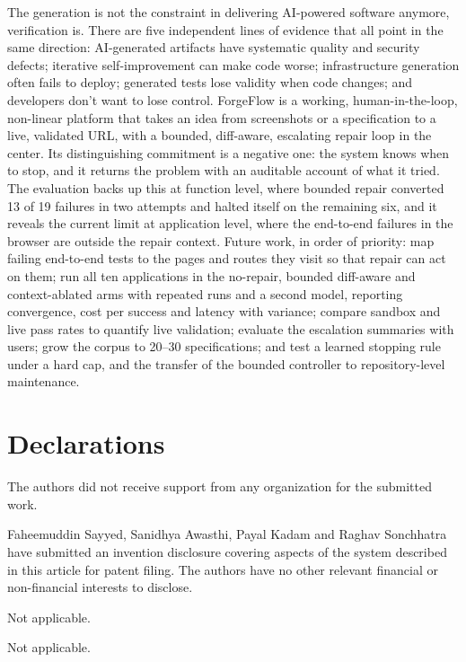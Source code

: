 \documentclass[pdflatex,sn-mathphys-num]{sn-jnl}%
\theoremstyle{thmstyleone}%
\theoremstyle{thmstyletwo}%
\theoremstyle{thmstylethree}%
\begin{document}
The generation is not the constraint in delivering AI-powered software anymore, verification is. There are five independent lines of evidence that all point in the same direction: AI-generated artifacts have systematic quality and security defects; iterative self-improvement can make code worse; infrastructure generation often fails to deploy; generated tests lose validity when code changes; and developers don't want to lose control. ForgeFlow is a working, human-in-the-loop, non-linear platform that takes an idea from screenshots or a specification to a live, validated URL, with a bounded, diff-aware, escalating repair loop in the center. Its distinguishing commitment is a negative one: the system knows when to stop, and it returns the problem with an auditable account of what it tried. The evaluation backs up this at function level, where bounded repair converted 13 of 19 failures in two attempts and halted itself on the remaining six, and it reveals the current limit at application level, where the end-to-end failures in the browser are outside the repair context. Future work, in order of priority: map failing end-to-end tests to the pages and routes they visit so that repair can act on them; run all ten applications in the no-repair, bounded diff-aware and context-ablated arms with repeated runs and a second model, reporting convergence, cost per success and latency with variance; compare sandbox and live pass rates to quantify live validation; evaluate the escalation summaries with users; grow the corpus to 20--30 specifications; and test a learned stopping rule under a hard cap, and the transfer of the bounded controller to repository-level maintenance.

\backmatter

\section*{Declarations}

The authors did not receive support from any organization for the submitted work.

Faheemuddin Sayyed, Sanidhya Awasthi, Payal Kadam and Raghav Sonchhatra have submitted an invention disclosure covering aspects of the system described in this article for patent filing. The authors have no other relevant financial or non-financial interests to disclose.

Not applicable.

Not applicable.
\end{document}
